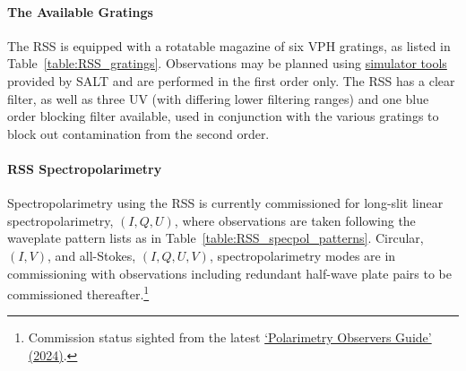 \paragraph{The Available Gratings}
The \gls{RSS} is equipped with a rotatable magazine of six \gls{VPH} gratings, as listed in Table~\ref{table:RSS_gratings}. Observations may be planned using \href{https://astronomers.salt.ac.za/software/}{simulator tools} provided by \gls{SALT} and are performed in the first order only. The \gls{RSS} has a clear filter, as well as three \gls{UV} (with differing lower filtering ranges) and one blue order blocking filter available, used in conjunction with the various gratings to block out contamination from the second order.



\paragraph{\gls{RSS} Spectropolarimetry} \label{sec:RSS_reductions}

Spectropolarimetry using the \gls{RSS} is currently commissioned for long-slit linear spectro\-polarimetry, $(I, Q, U)$, where observations are taken following the waveplate pattern lists as in Table~\ref{table:RSS_specpol_patterns}. Circular, $(I, V)$, and all-Stokes, $(I, Q, U, V)$, spectropolarimetry modes are in commissioning with observations including redundant half-wave plate pairs to be commissioned thereafter.\footnote{Commission status sighted from the latest \href{https://pysalt.salt.ac.za/proposal_calls/current/ProposalCall.html}{`Polarimetry Observers Guide' (2024)}.}


